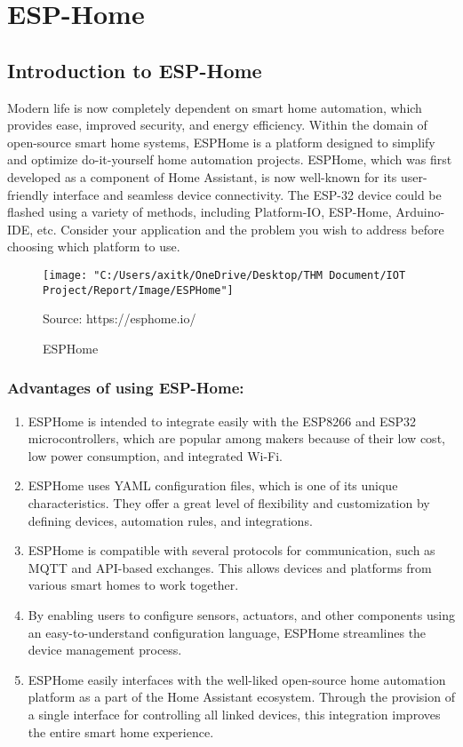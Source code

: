 \documentclass{article}
\begin{document}
	
	
	\section{ESP-Home}
	\subsection{Introduction to ESP-Home}
	
	Modern life is now completely dependent on smart home automation, which provides ease, improved security, and energy efficiency. Within the domain of open-source smart home systems, ESPHome is a platform designed to simplify and optimize do-it-yourself home automation projects. ESPHome, which was first developed as a component of Home Assistant, is now well-known for its user-friendly interface and seamless device connectivity. The ESP-32 device could be flashed using a variety of methods, including Platform-IO, ESP-Home, Arduino-IDE, etc. Consider your application and the problem you wish to address before choosing which platform to use.
	
	\begin{figure}[h]
		\centering
		\texttt{[image: "C:/Users/axitk/OneDrive/Desktop/THM Document/IOT Project/Report/Image/ESPHome"]}
		\caption{ESPHome}
		\small Source: https://esphome.io/
	\end{figure}
	
	\subsubsection{Advantages of using ESP-Home:}
	\begin{enumerate}
		\item ESPHome is intended to integrate easily with the ESP8266 and ESP32 microcontrollers, which are popular among makers because of their low cost, low power consumption, and integrated Wi-Fi.
		\item ESPHome uses YAML configuration files, which is one of its unique characteristics. They offer a great level of flexibility and customization by defining devices, automation rules, and integrations.
		\item ESPHome is compatible with several protocols for communication, such as MQTT and API-based exchanges. This allows devices and platforms from various smart homes to work together.
		\item By enabling users to configure sensors, actuators, and other components using an easy-to-understand configuration language, ESPHome streamlines the device management process.
		\item ESPHome easily interfaces with the well-liked open-source home automation platform as a part of the Home Assistant ecosystem. Through the provision of a single interface for controlling all linked devices, this integration improves the entire smart home experience.
	\end{enumerate}
	
\end{document}
